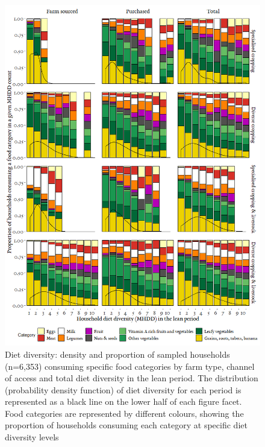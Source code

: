 \begin{figure}[H]
  \includegraphics[width=1\textwidth]{figs_06/image3.png}
    \captionsetup{singlelinecheck = false, justification=justified}
  \caption{Diet diversity: density and proportion of sampled households (n=6,353) consuming specific food categories by farm type, channel of access and total diet diversity in the lean period. The distribution (probability density function) of diet diversity for each period is represented as a black line on the lower half of each figure facet. Food categories are represented by different colours, showing the proportion of households consuming each category at specific diet diversity levels}
  \label{fig:06_3}
\end{figure}

